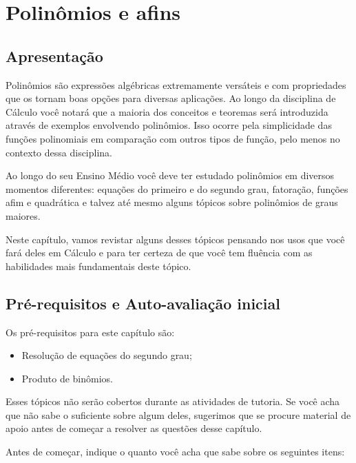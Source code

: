 \documentclass[main.tex]{subfiles}
\begin{document}
\paraAmbos

\chapter{Polinômios e afins}

\paraAlunos

\section{Apresentação}

Polinômios são expressões algébricas extremamente versáteis e com propriedades que os tornam boas opções para diversas aplicações. Ao longo da disciplina de Cálculo você notará que a maioria dos conceitos e teoremas será introduzida através de exemplos envolvendo polinômios. Isso ocorre pela simplicidade das funções polinomiais em comparação com outros tipos de função, pelo menos no contexto dessa disciplina.

Ao longo do seu Ensino Médio você deve ter estudado polinômios em diversos momentos diferentes: equações do primeiro e do segundo grau, fatoração, funções afim e quadrática e talvez até mesmo alguns tópicos sobre polinômios de graus maiores.

Neste capítulo, vamos revistar alguns desses tópicos pensando nos usos que você fará deles em Cálculo e para ter certeza de que você tem fluência com as habilidades mais fundamentais deste tópico.

\newpage

\section{Pré-requisitos e Auto-avaliação inicial}

Os pré-requisitos para este capítulo são:
\begin{itemize}
 \item Resolução de equações do segundo grau;
 \item Produto de binômios.
\end{itemize}

Esses tópicos não serão cobertos durante as atividades de tutoria. Se você acha que não sabe o suficiente sobre algum deles, sugerimos que se procure material de apoio antes de começar a resolver as questões desse capítulo.

Antes de começar, indique o quanto você acha que sabe sobre os seguintes itens:
\end{document}
